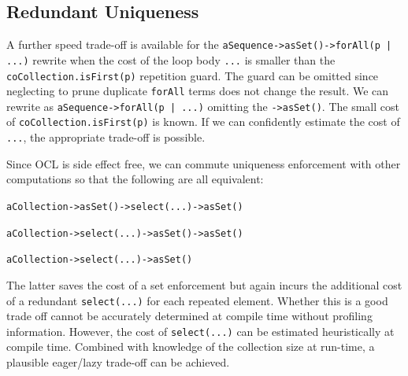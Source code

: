 \documentclass[
]{ceurart}
\begin{document}


\subsection{Redundant Uniqueness}

A further speed trade-off is available for the \verb!aSequence->asSet()->forAll(p | ...)! rewrite when the cost of the loop body \verb!...! is smaller than the \verb!coCollection.isFirst(p)! repetition guard. The guard can be omitted since neglecting to prune duplicate \verb!forAll! terms does not change the result. We can rewrite as \verb!aSequence->forAll(p | ...)! omitting the \verb!->asSet()!. The small cost of \verb!coCollection.isFirst(p)! is known. If we can confidently estimate the cost of \verb!...!, the appropriate trade-off is possible.

Since OCL is side effect free, we can commute uniqueness enforcement with other computations so that the following are all equivalent:

\begin{description}[itemsep=-0.2cm]\vspace{-10pt}\small\begin{samepage}
\item \verb!aCollection->asSet()->select(...)->asSet()!
\item \verb!aCollection->select(...)->asSet()->asSet()!
\item \verb!aCollection->select(...)->asSet()!
\end{samepage}\vspace{-10pt}\end{description}

The latter saves the cost of a set enforcement but again incurs the additional cost of a redundant \verb!select(...)! for each repeated element. Whether this is a good trade off cannot be accurately determined at compile time without profiling information. However, the cost of \verb!select(...)! can be estimated heuristically at compile time. Combined with knowledge of the collection size at run-time, a plausible eager/lazy trade-off can be achieved.
\end{document}
